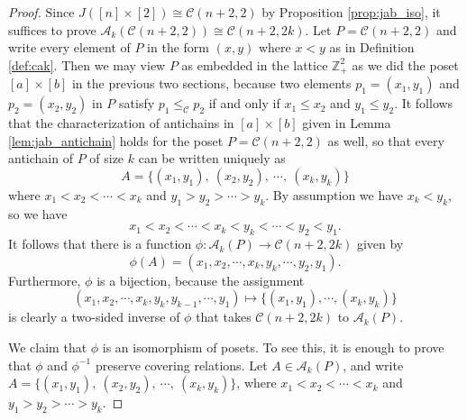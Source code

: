 \documentclass[11pt]{amsart}
\theoremstyle{plain}
\theoremstyle{definition}
\theoremstyle{remark}
\numberwithin{equation}{section}
\newcommand{\Z}{{\mathbb Z}}
\newcommand{\ra}{\rightarrow}
\newcommand{\cala}{\mathcal{A}}
\newcommand{\calc}{\mathcal{C}}
\newcommand{\akp}{\mathcal{A}_k(P)}
\newcommand{\inverse}{^{-1}}
\begin{document}
\begin{proof}
Since $J([n]\times [2])\cong \calc(n+2,2)$ by Proposition \ref{prop:jab_iso}, it
suffices to prove $\cala_k(\calc(n+2,2))\cong \calc(n+2,2k)$. Let
$P=\calc(n+2,2)$ and write every element of $P$ in the form $(x,y)$ where $x<y$
as in Definition \ref{def:cak}. Then we may view $P$ as embedded in the lattice
$\Z_+^2$ as we did the poset $[a]\times[b]$ in the previous two sections, because two elements $p_1=(x_1,y_1)$ and
$p_2=(x_2,y_2)$ in $P$ satisfy $p_1\le_\calc p_2$ if and only if $x_1\le x_2$
and $y_1\le y_2$. It follows that the characterization of antichains in
$[a]\times [b]$ given in Lemma \ref{lem:jab_antichain}
holds for the poset $P=\calc(n+2,2)$ as well, so that
every antichain of $P$ of size $k$ can be written uniquely as 
\[
    A = \{ (x_1, y_1), \ (x_2, y_2), \ \cdots, \ (x_k, y_k)\}
\] 
where $x_1 < x_2 < \cdots < x_k$ and $y_1 > y_2 > \cdots > y_k$.
By assumption we have $x_k<y_k$, so we have 
\[
x_1<x_2<\cdots<x_k<y_k<\cdots<y_2<y_1. 
\] 
It follows that there is a function $\phi : \cala_k(P) \ra \calc(n+2, 2k)$ given
by $$ \phi(A) = (x_1, x_2, \cdots, x_k, y_k, \cdots, y_2, y_1).$$  Furthermore,
$\phi$ is a bijection, because the assignment 
\[
    (x_1, x_2,\cdots, x_k, y_k, y_{k-1},\cdots, y_1) \mapsto \{(x_1,y_1), \cdots, (x_k,y_k)\}
\]
is clearly a two-sided inverse of $\phi$ that takes $\calc(n+2,2k)$ to $\akp$.

We claim that $\phi$ is an isomorphism of posets. To see this, it is enough to
prove that $\phi$ and $\phi\inverse$ preserve covering relations. Let $A \in
\cala_k(P)$, and write $A = \{ (x_1, y_1), \ (x_2, y_2), \ \cdots, \ (x_k,
y_k)\}$, where $x_1 < x_2 < \cdots < x_k$ and $y_1 > y_2 > \cdots > y_k$.


\end{proof}
\end{document}

